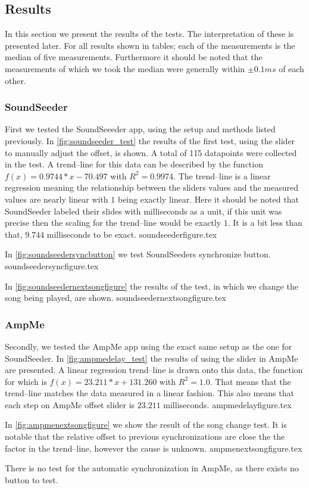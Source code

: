 \subsection{Results}
In this section we present the results of the tests.
The interpretation of these is presented later.
For all results shown in tables; each of the measurements is the median of five measurements. 
Furthermore it should be noted that the measurements of which we took the median were generally within $\pm 0.1 ms$ of each other. 

\subsubsection{SoundSeeder}
First we tested the SoundSeeeder app, using the setup and methods listed previously.
In \vref{fig:soundseeder_test} the results of the first test, using the slider to manually adjust the offset, is shown. 
A total of 115 datapoints were collected in the test.
A trend--line for this data can be described by the function $f(x) = 0.9744 * x - 70.497$ with $R^2=0.9974$.
The trend--line is a linear regression meaning the relationship between the sliders values and the measured values are nearly linear with $1$ being exactly linear.
Here it should be noted that SoundSeeder labeled their slides with milliseconds as a unit, if this unit was precise then the scaling for the trend--line would be exactly $1$.
It is a bit less than that, $9.744$ milliseconds to be exact.
{soundseederfigure.tex}

In \vref{fig:soundseedersyncbutton} we test SoundSeeders synchronize button.
{soundseedersyncfigure.tex}

In \vref{fig:soundseedernextsongfigure} the results of the test, in which we change the song being played, are shown. 
{soundseedernextsongfigure.tex}

\subsubsection{AmpMe}
Secondly, we tested the AmpMe app using the exact same setup as the one for SoundSeeder. 
In \vref{fig:ampmedelay_test} the results of using the slider in AmpMe are presented.
A linear regression trend--line is drawn onto this data, the function for which is $f(x) = 23.211 * x + 131.260$ with $R^2 = 1.0$.
That means that the trend--line matches the data measured in a linear fashion. 
This also means that each step on AmpMe offset slider is $23.211$ milliseconds. 
{ampmedelayfigure.tex}

In \vref{fig:ampmenextsongfigure} we show the result of the song change test. 
It is notable that the relative offset to previous synchronizations are close the the factor in the trend--line, however the cause is unknown. 
{ampmenextsongfigure.tex}

There is no test for the automatic synchronization in AmpMe, as there exists no button to test. 

